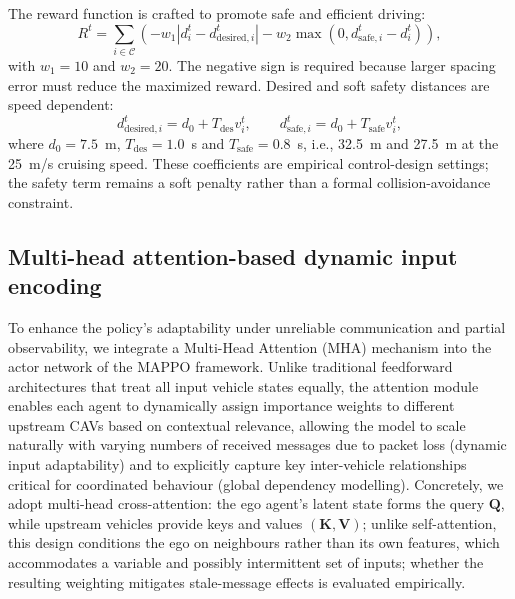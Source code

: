 \documentclass{ieeeaccess}
\begin{document}
The reward function is crafted to promote safe and efficient driving:
\begin{equation}
R^t = \sum_{i\in\mathcal C}
\left(
-w_1 |d_i^t-d_{\mathrm{desired},i}^t|
-w_2 \max(0,d_{\mathrm{safe},i}^t-d_i^t)
\right),
\end{equation}
with $w_1=10$ and $w_2=20$. The negative sign is required because larger spacing error must reduce the maximized reward. Desired and soft safety distances are speed dependent:
\begin{equation}
d_{\mathrm{desired},i}^{t}=d_0+T_{\mathrm{des}}v_i^t,\qquad
d_{\mathrm{safe},i}^{t}=d_0+T_{\mathrm{safe}}v_i^t,
\end{equation}
where $d_0=7.5$~m, $T_{\mathrm{des}}=1.0$~s and $T_{\mathrm{safe}}=0.8$~s, i.e., 32.5~m and 27.5~m at the 25~m/s cruising speed. These coefficients are empirical control-design settings; the safety term remains a soft penalty rather than a formal collision-avoidance constraint. %


\subsection{Multi-head attention-based dynamic input encoding}
To enhance the policy's adaptability under unreliable communication and partial observability, we integrate a Multi-Head Attention (MHA) mechanism into the actor network of the MAPPO framework. Unlike traditional feedforward architectures that treat all input vehicle states equally, the attention module enables each agent to dynamically assign importance weights to different upstream CAVs based on contextual relevance, allowing the model to scale naturally with varying numbers of received messages due to packet loss (dynamic input adaptability) and to explicitly capture key inter-vehicle relationships critical for coordinated behaviour (global dependency modelling). Concretely, we adopt multi-head cross-attention: the ego agent's latent state forms the query $\mathbf{Q}$, while upstream vehicles provide keys and values $(\mathbf{K},\mathbf{V})$; unlike self-attention, this design conditions the ego on neighbours rather than its own features, which accommodates a variable and possibly intermittent set of inputs; whether the resulting weighting mitigates stale-message effects is evaluated empirically.
\end{document}
